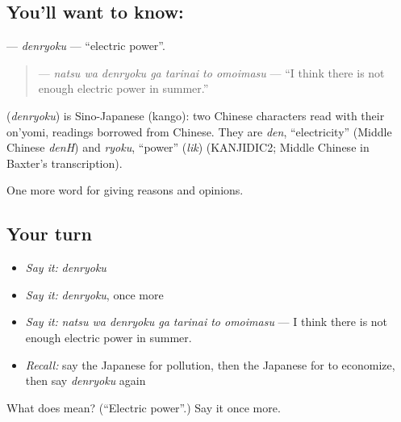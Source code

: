 \subsection*{You'll want to know: }
\textbf{} — \emph{denryoku} — \textquotedblleft{}electric power\textquotedblright{}.

\begin{quote}
\textbf{   } — \emph{natsu wa denryoku ga tarinai to omoimasu} — \textquotedblleft{}I think there is not enough electric power in summer.\textquotedblright{}
\end{quote}

\begin{cousinweb}
\textbf{} (\emph{denryoku}) is Sino-Japanese (kango): two Chinese characters read with their on'yomi, readings borrowed from Chinese. They are \emph{den}, \textquotedblleft{}electricity\textquotedblright{} (Middle Chinese \emph{denH}) and \emph{ryoku}, \textquotedblleft{}power\textquotedblright{} (\emph{lik}) (KANJIDIC2; Middle Chinese in Baxter's transcription).
\end{cousinweb}

\begin{grammarlens}[title={What you've built}]
One more word for giving reasons and opinions.
\end{grammarlens}

\subsection*{Your turn}
\begin{itemize}
\raggedright
  \item \emph{Say it:} \emph{denryoku}
  \item \emph{Say it:} \emph{denryoku}, once more
  \item \emph{Say it:} \emph{natsu wa denryoku ga tarinai to omoimasu} — I think there is not enough electric power in summer.
  \item \emph{Recall:} say the Japanese for pollution, then the Japanese for to economize, then say \emph{denryoku} again
\end{itemize}

\begin{tcolorbox}[breakable,colback=teal!4,colframe=teal!35!black,title={Before you move on}]
What does  mean? (\textquotedblleft{}Electric power\textquotedblright{}.) Say it once more.
\end{tcolorbox}
